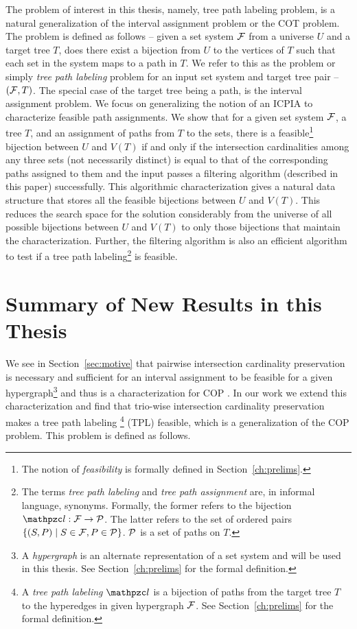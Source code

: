 \documentclass[MS]             %
              {iitmdiss_as}    %
\begin{document}
The problem of interest in this thesis, namely, tree path labeling
problem, is a natural generalization of the interval assignment
problem or the COT problem. The problem is defined as follows -- given
a set system ${\cal F}$ from a universe $U$ and a target tree $T$, does
there exist a bijection from $U$ to the vertices of $T$ such that each
set in the system maps to a path in $T$.  We refer to this as the
{\CFTPL} problem or simply {\em tree path labeling} problem for an
input set system and target tree pair -- $({\cal F},T)$. The special case
of the target tree being a path, is the interval assignment problem.
We focus on generalizing the notion of an ICPIA \cite{nsnrs09} to
characterize feasible path assignments.  We show that for a given set
system ${\cal F}$, a tree $T$, and an assignment of paths from $T$ to the
sets, there is a feasible\footnote{The notion of {\em feasibility} is
  formally defined in Section~\ref{ch:prelims}.}  bijection between
$U$ and $V(T)$ if and only if the intersection cardinalities among any
three sets (not necessarily distinct) is equal to that of the
corresponding paths assigned to them and the input passes a filtering
algorithm (described in this paper) successfully.  This algorithmic
characterization gives a natural data structure that stores all the
 feasible bijections between $U$ and $V(T)$. This
reduces the search space for the solution considerably from the
universe of all possible bijections between $U$ and $V(T)$ to only
those bijections that maintain the characterization.  Further, the
filtering algorithm is also an efficient algorithm to test if a tree
path labeling\footnote{The terms {\em tree path labeling} and {\em
    tree path assignment} are, in informal language,
  synonyms. Formally, the former refers to the bijection $\cl: \cF
  \rightarrow \cP$. The latter refers to the set of ordered pairs
  $\{(S, P) \mid S \in {\cal F}, P \in {\cal P}\}$. ${\cal P}$ is a set of paths on
  $T$.} is feasible.


\section{Summary of New Results in this Thesis}
\label{sec:results}

We see in Section~\ref{sec:motive} that pairwise intersection
cardinality preservation is necessary and sufficient for an interval
assignment to be feasible for a given hypergraph\footnote{A {\em
    hypergraph} is an alternate representation of a set system and
  will be used in this thesis. See Section~\ref{ch:prelims} for the
  formal definition.} and thus is a characterization for COP
\cite{nsnrs09}.  In our work we extend this characterization
and find that trio-wise intersection cardinality preservation makes a
tree path labeling \footnote{A {\em tree path labeling} $\cl$ is a
  bijection of paths from the target tree $T$ to the hyperedges in
  given hypergraph ${\cal F}$.  See Section~\ref{ch:prelims} for the formal
  definition.}  (TPL) feasible, which is a generalization of the COP
problem. This problem is defined as follows.
\end{document}
